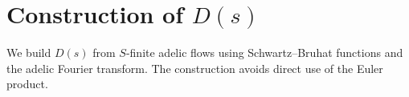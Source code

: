 \section{Construction of $D(s)$}

We build $D(s)$ from $S$-finite adelic flows using Schwartz--Bruhat functions 
and the adelic Fourier transform. The construction avoids direct use of the Euler product.
